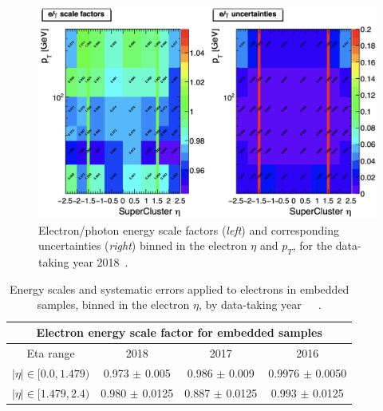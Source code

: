 \begin{figure}[ht]
    \centering
    \includegraphics[width=15cm]{figures/ch-5-object-reconstruction-and-corrections-applied/egamma-POG-UL-egamma-scale-factors.png}
    \caption[Electron/photon energy scale factors and uncertainties for 2018.]{Electron/photon energy scale factors (\textit{left}) and corresponding uncertainties (\textit{right}) binned in the electron $\eta$ and $p_{T}$, for the data-taking year 2018~\cite{twiki_Electron_UL_2016_2017_2018}.} 
    \label{fig:egamma-POG-UL-egamma-scale-factors}
\end{figure}


\begin{table}[ht]
    \centering
    \begin{tabular}{|c|c|c|c|}
    \hline
    \multicolumn{4}{|c|}{Electron energy scale factor for embedded samples}                                   \\ \hline
    \hline
    Eta range                   & 2018               & 2017               & 2016     \\ \hline
    $|\eta| \in [0.0, 1.479)$   & 0.973 $\pm$ 0.005  & 0.986 $\pm$ 0.009  & 0.9976 $\pm$ 0.0050 \\
    $|\eta| \in [1.479, 2.4)$   & 0.980 $\pm$ 0.0125 & 0.887 $\pm$ 0.0125 & 0.993 $\pm$ 0.0125 \\ \hline
    \end{tabular}
    \caption[Energy scales and systematic errors applied to electrons in embedded samples by data-taking year/era.]{Energy scales and systematic errors applied to electrons in embedded samples, binned in the electron $\eta$, by data-taking year~\cite{twiki_embedded_preUL_2016}~\cite{twiki_embedded_preUL_2017}~\cite{twiki_embedded_preUL_2018}.}
    \label{table:ele-ES-embedded}
\end{table}

